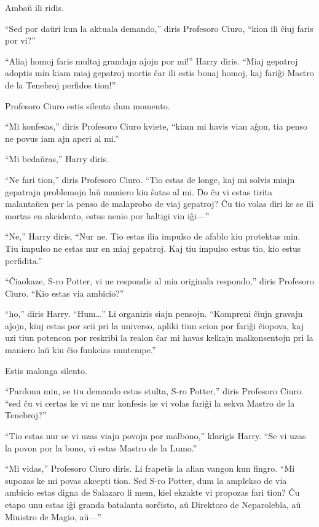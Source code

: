 Ambaŭ ili ridis.

``Sed por daŭri kun la aktuala demando,'' diris Profesoro Ciuro, ``kion ili ĉiuj faris por vi?''

``Aliaj homoj faris multaj grandajn aĵojn por mi!'' Harry
diris. ``Miaj gepatroj adoptis min kiam miaj gepatroj mortis ĉar ili
estis bonaj homoj, kaj fariĝi Mastro de la Tenebroj perfidos tion!''

Profesoro Ciuro estis silenta dum momento.

``Mi konfesas,'' diris Profesoro Ciuro kviete, ``kiam mi havis vian
aĝon, tia penso ne povus iam ajn aperi al mi.''

``Mi bedaŭras,'' Harry diris.

``Ne fari tion,'' diris Profesoro Ciuro. ``Tio estas de longe, kaj mi
solvis miajn gepatrajn problemojn laŭ maniero kiu ŝatas al mi. Do ĉu
vi estas tirita malantaŭen per la penso de malaprobo de viaj gepatroj?
Ĉu tio volas diri ke se ili mortas en akcidento, estus nenio por
haltigi vin iĝi—''

``Ne,'' Harry diris, ``Nur ne. Tio estas ilia impulso de afablo kiu
protektas min. Tiu impulso ne estas nur en miaj gepatroj. Kaj tiu
impulso estus tio, kio estus perfidita.''

``Ĉiaokaze, S-ro Potter, vi ne respondis al mia originala respondo,''
diris Profesoro Ciuro. ``Kio estas via ambicio?''

``ho,'' diris Harry. ``Hum\ldots'' Li organizis siajn
pensojn. ``Kompreni ĉiujn gravajn aĵojn, kiuj estas por scii pri la
universo, apliki tiun scion por fariĝi ĉiopova, kaj uzi tiun potencon
por reskribi la realon ĉar mi havas kelkajn malkonsentojn pri la
maniero laŭ kiu ĉio funkcias nuntempe.''

Estis malonga silento.

``Pardonu min, se tiu demando estas stulta, S-ro Potter,'' diris
Profesoro Ciuro. ``sed ĉu vi certas ke vi ne nur konfesis ke vi volas
fariĝi la sekva Mastro de la Tenebroj?''

``Tio estas nur se vi uzas viajn povojn por malbono,'' klarigis
Harry. ``Se vi uzas la povon por la bono, vi estas Mastro de la
Lumo.''

``Mi vidas,'' Profesoro Ciuro diris. Li frapetis la alian vangon kun
fingro. ``Mi supozas ke mi povas akcepti tion. Sed S-ro Potter, dum la
amplekso de via ambicio estas digna de Salazaro li mem, kiel ekzakte
vi propozas fari tion? Ĉu etapo unu estas iĝi granda batalanta
sorĉisto, aŭ Direktoro de Neparolebla, aŭ Ministro de Magio, aŭ—''

